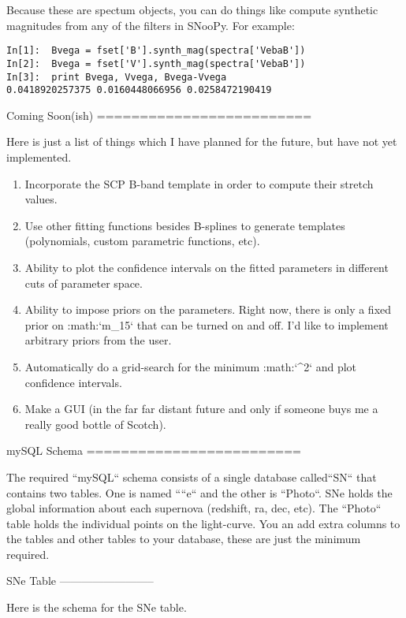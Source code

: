 Because these are spectum objects, you can do things like compute
synthetic magnitudes from any of the filters in SNooPy. For example:

\begin{verbatim}
In[1]:  Bvega = fset['B'].synth_mag(spectra['VebaB'])
In[2]:  Bvega = fset['V'].synth_mag(spectra['VebaB'])
In[3]:  print Bvega, Vvega, Bvega-Vvega 
0.0418920257375 0.0160448066956 0.0258472190419
\end{verbatim}


Coming Soon(ish)
=========================

Here is just a list of things which I have planned for the future,
but have not yet implemented.
\begin{enumerate}
\item Incorporate the SCP B-band template in order to compute their stretch
values.
\item Use other fitting functions besides B-splines to generate templates
(polynomials, custom parametric functions, etc).
\item Ability to plot the confidence intervals on the fitted parameters
in different cuts of parameter space.
\item Ability to impose priors on the parameters. Right now, there is only
a fixed prior on :math:`\Delta m_{15}` that can be turned on and off. I'd
like to implement arbitrary priors from the user.
\item Automatically do a grid-search for the minimum :math:`\chi^{2}` and plot
confidence intervals.
\item Make a GUI (in the far far distant future and only if someone buys
me a really good bottle of Scotch).
\end{enumerate}




\appendix

mySQL Schema
=========================

\label{sec:mySQL-Schema}The required ``mySQL`` schema consists
of a single database called\noun{ }``SN`` that contains two tables.
One is named ````e`` and the other is ``Photo``.
SNe holds the global information about each supernova (redshift, ra,
dec, etc). The ``Photo`` table holds the individual points on
the light-curve. You an add extra columns to the tables and other
tables to your database, these are just the minimum required.


SNe Table
--------------------------

Here is the schema for the SNe table. 

